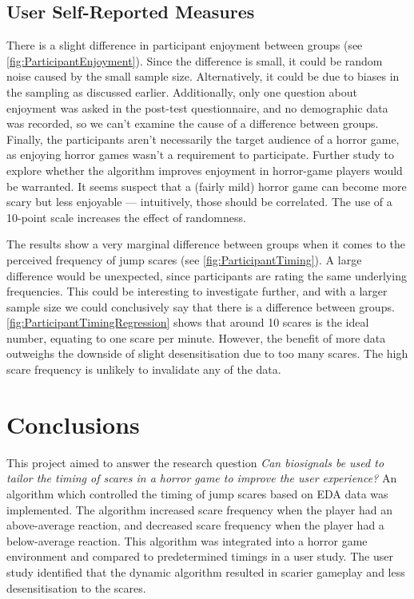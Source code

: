 \documentclass[12pt,a4paper]{article}\usepackage[]{graphicx}\usepackage[]{color}
\begin{document}
\subsection{User Self-Reported Measures}
There is a slight difference in participant enjoyment between groups (see \vref{fig:ParticipantEnjoyment}).
Since the difference is small, it could be random noise caused by the small sample size.
Alternatively, it could be due to biases in the sampling as discussed earlier.
Additionally, only one question about enjoyment was asked in the post-test questionnaire, and no demographic data was recorded, so we can't examine the cause of a difference between groups.
Finally, the participants aren't necessarily the target audience of a horror game, as enjoying horror games wasn't a requirement to participate.
Further study to explore whether the algorithm improves enjoyment in horror-game players would be warranted.
It seems suspect that a (fairly mild) horror game can become more scary but less enjoyable --- intuitively, those should be correlated.
The use of a 10-point scale increases the effect of randomness.

The results show a very marginal difference between groups when it comes to the perceived frequency of jump scares (see \vref{fig:ParticipantTiming}).
A large difference would be unexpected, since participants are rating the same underlying frequencies.
This could be interesting to investigate further, and with a larger sample size we could conclusively say that there is a difference between groups.
\vref{fig:ParticipantTimingRegression} shows that around 10 scares is the ideal number, equating to one scare per minute.
However, the benefit of more data outweighs the downside of slight desensitisation due to too many scares.
The high scare frequency is unlikely to invalidate any of the data.

\section{Conclusions}

This project aimed to answer the research question \emph{Can biosignals be used to tailor the timing of scares in a horror game to improve the user experience?}
An algorithm which controlled the timing of jump scares based on EDA data was implemented.
The algorithm increased scare frequency when the player had an above-average reaction, and decreased scare frequency when the player had a below-average reaction.
This algorithm was integrated into a horror game environment and compared to predetermined timings in a user study.
The user study identified that the dynamic algorithm resulted in scarier gameplay and less desensitisation to the scares.
\end{document}
